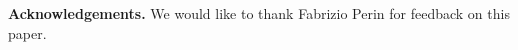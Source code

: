 \documentclass[preprint,12pt]{elsarticle}
\begin{document}
\vspace{0.5cm}
\footnotesize
{\bf Acknowledgements.} We would like to thank Fabrizio Perin for feedback on this paper.



\newpage

\footnotesize












\end{document}
